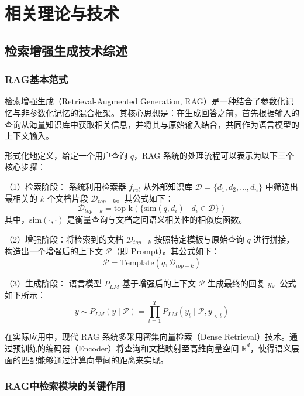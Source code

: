 \chapter{相关理论与技术}\label{chap:guide}

\section{检索增强生成技术综述}

\subsection{RAG基本范式}

检索增强生成（Retrieval-Augmented Generation, RAG）是一种结合了参数化记忆与非参数化记忆的混合框架。其核心思想是：在生成回答之前，首先根据输入的查询从海量知识库中获取相关信息，并将其与原始输入结合，共同作为语言模型的上下文输入。

形式化地定义，给定一个用户查询 $q$，RAG 系统的处理流程可以表示为以下三个核心步骤：

（1）检索阶段： 系统利用检索器 $f_{ret}$ 从外部知识库 $\mathcal{D} = \{d_1, d_2, \dots, d_n\}$ 中筛选出最相关的 $k$ 个文档片段 $\mathcal{D}_{top-k}$。其公式如下：
\begin{equation}
    \mathcal{D}_{top-k} = \text{top-k}(\{ \text{sim}(q, d_i) \mid d_i \in \mathcal{D} \})
\end{equation}
其中，$\text{sim}(\cdot, \cdot)$ 是衡量查询与文档之间语义相关性的相似度函数。

（2）增强阶段：将检索到的文档 $\mathcal{D}_{top-k}$ 按照特定模板与原始查询 $q$ 进行拼接，构造出一个增强后的上下文 $\mathcal{P}$（即 Prompt）。其公式如下：
\begin{equation}
    \mathcal{P} = \text{Template}(q, \mathcal{D}_{top-k})
\end{equation}

（3）生成阶段： 语言模型 $P_{LM}$ 基于增强后的上下文 $\mathcal{P}$ 生成最终的回复 $y$。公式如下所示：
\begin{equation}
    y \sim P_{LM}(y \mid \mathcal{P}) = \prod_{t=1}^T P_{LM}(y_t \mid \mathcal{P}, y_{<t})
\end{equation}

在实际应用中，现代 RAG 系统多采用密集向量检索（Dense Retrieval）技术。通过预训练的编码器（Encoder）将查询和文档映射至高维向量空间 $\mathbb{R}^d$，使得语义层面的匹配能够通过计算向量间的距离来实现。

\subsection{RAG中检索模块的关键作用}

